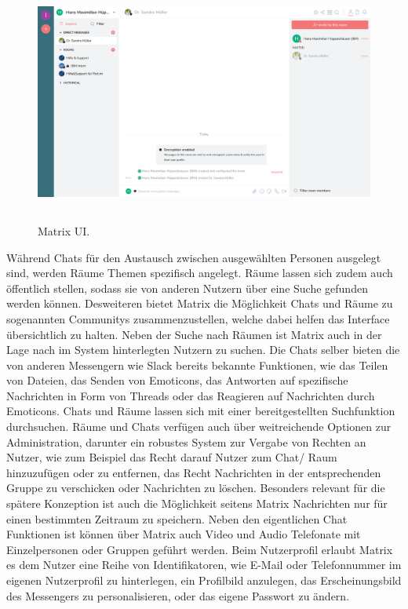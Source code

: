\begin{figure}[htb]
    \centering
    \includegraphics[height=8cm]{graphics/unknown-3.png}
    \caption[Matrix UI]{Matrix UI.\footnotemark}
    \label{abb:UI}
\end{figure}

Während Chats für den Austausch zwischen ausgewählten Personen ausgelegt sind, werden Räume Themen spezifisch angelegt. Räume lassen sich zudem auch öffentlich stellen, sodass sie von anderen Nutzern über eine Suche gefunden werden können. Desweiteren bietet Matrix die Möglichkeit Chats und Räume zu sogenannten Communitys zusammenzustellen, welche dabei helfen das Interface übersichtlich zu halten.
Neben der Suche nach Räumen ist Matrix auch in der Lage nach im System hinterlegten Nutzern zu suchen. Die Chats selber bieten die von anderen Messengern wie Slack bereits bekannte Funktionen, wie das Teilen von Dateien, das Senden von Emoticons, das Antworten auf spezifische Nachrichten in Form von Threads oder das Reagieren auf Nachrichten durch Emoticons. Chats und Räume lassen sich mit einer bereitgestellten Suchfunktion durchsuchen. Räume und Chats verfügen auch über weitreichende Optionen zur Administration, darunter ein robustes System zur Vergabe von Rechten an Nutzer, wie zum Beispiel das Recht darauf Nutzer zum Chat/ Raum hinzuzufügen oder zu entfernen, das Recht Nachrichten in der entsprechenden Gruppe zu verschicken oder Nachrichten zu löschen. Besonders relevant für die spätere Konzeption ist auch die Möglichkeit seitens Matrix Nachrichten nur für einen bestimmten Zeitraum zu speichern.
Neben den eigentlichen Chat Funktionen ist können über Matrix auch Video und Audio Telefonate mit Einzelpersonen oder Gruppen geführt werden. Beim Nutzerprofil erlaubt Matrix es dem Nutzer eine Reihe von Identifikatoren, wie E-Mail oder Telefonnummer im eigenen Nutzerprofil zu hinterlegen, ein Profilbild anzulegen, das Erscheinungsbild des Messengers zu personalisieren, oder das eigene Passwort zu ändern.

